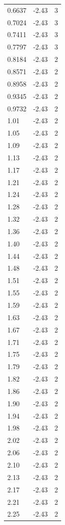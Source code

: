 \begin{longtable}{lrr}
  0.6637 & -2.43 & 3 \\
  0.7024 & -2.43 & 3 \\
  0.7411 & -2.43 & 3 \\
  0.7797 & -2.43 & 3 \\
  0.8184 & -2.43 & 2 \\
  0.8571 & -2.43 & 2 \\
  0.8958 & -2.43 & 2 \\
  0.9345 & -2.43 & 2 \\
  0.9732 & -2.43 & 2 \\
  1.01 & -2.43 & 2 \\
  1.05 & -2.43 & 2 \\
  1.09 & -2.43 & 2 \\
  1.13 & -2.43 & 2 \\
  1.17 & -2.43 & 2 \\
  1.21 & -2.43 & 2 \\
  1.24 & -2.43 & 2 \\
  1.28 & -2.43 & 2 \\
  1.32 & -2.43 & 2 \\
  1.36 & -2.43 & 2 \\
  1.40 & -2.43 & 2 \\
  1.44 & -2.43 & 2 \\
  1.48 & -2.43 & 2 \\
  1.51 & -2.43 & 2 \\
  1.55 & -2.43 & 2 \\
  1.59 & -2.43 & 2 \\
  1.63 & -2.43 & 2 \\
  1.67 & -2.43 & 2 \\
  1.71 & -2.43 & 2 \\
  1.75 & -2.43 & 2 \\
  1.79 & -2.43 & 2 \\
  1.82 & -2.43 & 2 \\
  1.86 & -2.43 & 2 \\
  1.90 & -2.43 & 2 \\
  1.94 & -2.43 & 2 \\
  1.98 & -2.43 & 2 \\
  2.02 & -2.43 & 2 \\
  2.06 & -2.43 & 2 \\
  2.10 & -2.43 & 2 \\
  2.13 & -2.43 & 2 \\
  2.17 & -2.43 & 2 \\
  2.21 & -2.43 & 2 \\
  2.25 & -2.43 & 2 \\

\end{longtable}
